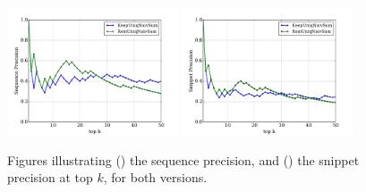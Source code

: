 \begin{figure}[H]
\ffigbox
{%
  \begin{subfloatrow}[2]
  \ffigbox[\FBwidth]
    {\caption{}\label{res:exp2-sequence-precision}}
    {\includegraphics[width=0.45\textwidth]{results/exp2-sequence-precision.pdf}}
  \hspace{1em}%
  \ffigbox[\FBwidth]
    {\caption{}\label{res:exp2-snippet-precision}}
    {\includegraphics[width=0.45\textwidth]{results/exp2-snippet-precision.pdf}}
  \end{subfloatrow}}
  {\caption[Illustration of the precision at top $k$\protect\\($RemUniqNaivSum$, $RemUniqNaivSum$)]{Figures illustrating () the sequence precision, and () the snippet precision at top $k$, for both versions.}
\label{res:exp2-precisionatk}}
\end{figure}

\vspace{-20pt}

